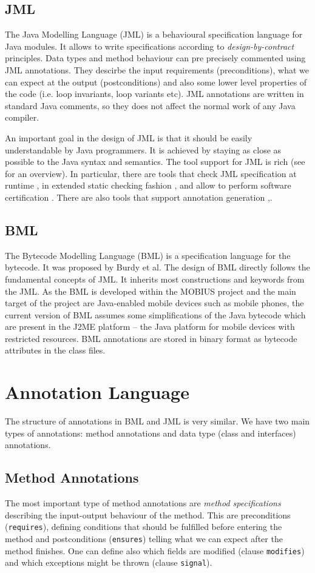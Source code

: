 \documentclass{acm_proc_article-sp}
\begin{document}
\subsection{JML}
The Java Modelling Language (JML) is a behavioural specification language for Java modules. It allows to write specifications according to \textit{design-by-contract} principles. Data types and method behaviour can pre precisely commented using JML annotations. They descirbe the input requirements (preconditions), what we can expect at the output (postconditions) and also some lower level properties of the code (i.e. loop invariants, loop variants etc). JML annotations are written in standard Java comments, so they does not affect the normal work of any Java compiler.

An important goal in the design of JML is that it should be easily understandable by Java programmers. It is achieved by staying as close as possible to the Java syntax and semantics. The tool support for JML is rich (see \cite{overviewOfJML} for an overview). In particular, there are tools that check JML specification at runtime \cite{runtime}, in extended static checking fashion \cite{escJava}, and allow to perform software certification \cite{krakatoa}. There are also tools that support annotation generation \cite{canapa},\cite{daikon}.
\subsection{BML}
The Bytecode Modelling Language (BML) is a specification language for the bytecode. It was proposed by Burdy et al. \cite{bmlBurdy} The design of BML directly follows the fundamental concepts of JML. It inherits most constructions and keywords from the JML. As the BML is developed within the MOBIUS \cite{mobius} project and the main target of the project are Java-enabled mobile devices such as mobile phones, the current version of BML assumes some simplifications of the Java bytecode which are present in the J2ME platform -- the Java platform for mobile devices with restricted resources. BML annotations are stored in binary format as bytecode attributes in the class files.
\section{Annotation Language}
The structure of annotations in BML and JML is very similar. We have two main types of annotations: method annotations and data type (class and interfaces) annotations.
\subsection{Method Annotations}
The most important type of method annotations are \textit{method specifications} describing the input-output behaviour of the method. This are preconditions (\texttt{requires}), defining conditions that should be fulfilled before entering the method and postconditions (\texttt{ensures}) telling what we can expect after the method finishes. One can define also which fields are modified (clause \texttt{modifies}) and which exceptions might be thrown (clause \texttt{signal}).
\end{document}
